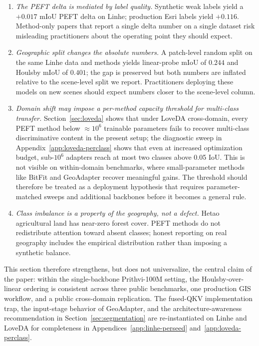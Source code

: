 \begin{enumerate}[leftmargin=1.5em,itemsep=0.2em]
    \item \emph{The PEFT delta is mediated by label quality.} Synthetic weak labels yield a $+0.017$ mIoU PEFT delta on Linhe; production Esri labels yield $+0.116$. Method-only papers that report a single delta number on a single dataset risk misleading practitioners about the operating point they should expect.
    \item \emph{Geographic split changes the absolute numbers.} A patch-level random split on the same Linhe data and methods yields linear-probe mIoU of $0.244$ and Houlsby mIoU of $0.401$; the gap is preserved but both numbers are inflated relative to the scene-level split we report. Practitioners deploying these models on new scenes should expect numbers closer to the scene-level column.
    \item \emph{Domain shift may impose a per-method capacity threshold for multi-class transfer.} Section~\ref{sec:loveda} shows that under LoveDA cross-domain, every PEFT method below $\approx$$10^6$ trainable parameters fails to recover multi-class discriminative content in the present setup; the diagnostic sweep in Appendix~\ref{app:loveda-perclass} shows that even at increased optimization budget, sub-$10^6$ adapters reach at most two classes above 0.05 IoU. This is not visible on within-domain benchmarks, where small-parameter methods like BitFit and GeoAdapter recover meaningful gains. The threshold should therefore be treated as a deployment hypothesis that requires parameter-matched sweeps and additional backbones before it becomes a general rule.
    \item \emph{Class imbalance is a property of the geography, not a defect.} Hetao agricultural land has near-zero forest cover. PEFT methods do not redistribute attention toward absent classes; honest reporting on real geography includes the empirical distribution rather than imposing a synthetic balance.
\end{enumerate}

This section therefore strengthens, but does not universalize, the central claim of the paper: within the single-backbone Prithvi-100M setting, the Houlsby-over-linear ordering is consistent across three public benchmarks, one production GIS workflow, and a public cross-domain replication. The fused-QKV implementation trap, the input-stage behavior of GeoAdapter, and the architecture-awareness recommendation in Section~\ref{sec:segmentation} are re-instantiated on Linhe and LoveDA for completeness in Appendices~\ref{app:linhe-perseed} and~\ref{app:loveda-perclass}.
